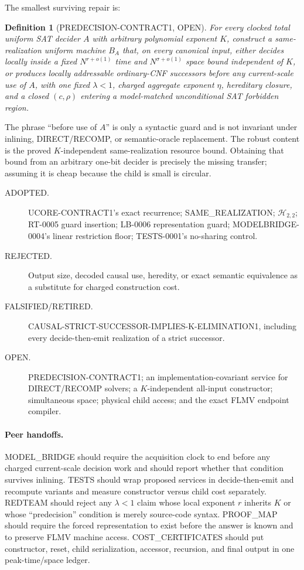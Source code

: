 \documentclass[11pt]{article}
\newtheorem{definition}{Definition}
\begin{document}
The smallest surviving repair is:
\begin{definition}[PREDECISION-CONTRACT1, OPEN]
For every clocked total uniform SAT decider $A$ with arbitrary polynomial
exponent $K$, construct a same-realization uniform machine $B_A$ that, on
every canonical input, either decides locally inside a fixed
$N^{r+o(1)}$ time and $N^{\sigma+o(1)}$ space bound independent of $K$, or
produces locally addressable ordinary-CNF successors before any current-scale
use of $A$, with one fixed $\lambda<1$, charged aggregate exponent $\eta$,
hereditary closure, and a closed $(c,\rho)$ entering a model-matched
unconditional SAT forbidden region.
\end{definition}

The phrase ``before use of $A$'' is only a syntactic guard and is not invariant
under inlining, DIRECT/RECOMP, or semantic-oracle replacement.  The robust
content is the proved $K$-independent same-realization resource bound.  Obtaining
that bound from an arbitrary one-bit decider is precisely the missing transfer;
assuming it is cheap because the child is small is circular.

\begin{description}
\item[ADOPTED.] UCORE-CONTRACT1's exact recurrence; SAME\_REALIZATION;
$\mathcal H_{2,2}$; RT-0005 guard insertion; LB-0006 representation guard;
MODELBRIDGE-0004's linear restriction floor; TESTS-0001's no-sharing control.
\item[REJECTED.] Output size, decoded causal use, heredity, or exact semantic
equivalence as a substitute for charged construction cost.
\item[FALSIFIED/RETIRED.]
\textsf{CAUSAL-STRICT-SUCCESSOR-IMPLIES-K-ELIMINATION1}, including every
decide-then-emit realization of a strict successor.
\item[OPEN.] PREDECISION-CONTRACT1; an implementation-covariant service for
DIRECT/RECOMP solvers; a $K$-independent all-input constructor; simultaneous
space; physical child access; and the exact FLMV endpoint compiler.
\end{description}

\paragraph{Peer handoffs.}
MODEL\_BRIDGE should require the acquisition clock to end before any charged
current-scale decision work and should report whether that condition survives
inlining.  TESTS should wrap proposed services in decide-then-emit and
recompute variants and measure constructor versus child cost separately.
REDTEAM should reject any $\lambda<1$ claim whose local exponent $r$ inherits
$K$ or whose ``predecision'' condition is merely source-code syntax.
PROOF\_MAP should require the forced representation to exist before the answer
is known and to preserve FLMV machine access.  COST\_CERTIFICATES should put
constructor, reset, child serialization, accessor, recursion, and final output
in one peak-time/space ledger.
\end{document}
